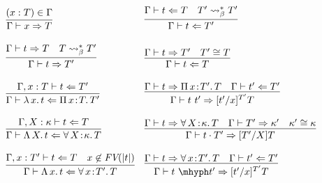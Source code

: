 \documentclass{article}
\newcommand{\abs}[4]{{#1}\, #2\! : \! #3.\, #4}
\newcommand{\absu}[3]{{#1}\, #2.\, #3}
\newcommand{\tpcheck}[0]{\Leftarrow}
\newcommand{\tpsynth}[0]{\Rightarrow}
\begin{document}
\begin{figure}
  \[
    \begin{array}{c}
  \begin{array}{ll}
    \infer{\Gamma\vdash x\tpsynth T}{(x : T)\in\Gamma} &
    \infer{\Gamma\vdash t\tpcheck T'}{\Gamma\vdash t \tpcheck T & T' \leadsto^*_\beta T'} \\ \\
    \infer{\Gamma\vdash t\tpsynth T'}{\Gamma\vdash t \tpsynth T & T \leadsto^*_\beta T'} &
    \infer{\Gamma\vdash t\tpcheck T}{\Gamma\vdash t\tpsynth T' & T' \cong T} \\ \\
    \infer{\Gamma\vdash \absu{\lambda}{x}{t} \tpcheck \abs{\Pi}{x}{T}{T'}}{\Gamma,x:T\vdash t\tpcheck T'} &
    \infer{\Gamma\vdash t\ t' \tpsynth [t'/x]^{T'}T}{\Gamma\vdash t \tpsynth \abs{\Pi}{x}{T'}{T} & \Gamma\vdash t' \tpcheck T'} \\ \\

    \infer{\Gamma\vdash \absu{\Lambda}{X}{t} \tpcheck \abs{\forall}{X}{\kappa}{T}}{\Gamma,X:\kappa\vdash t \tpcheck T} &
    \infer{\Gamma\vdash t \cdot T' \tpsynth [T'/X]T}
          {\Gamma\vdash t \tpsynth \abs{\forall}{X}{\kappa}{T} & \Gamma\vdash T' \tpsynth \kappa' & \kappa'\cong\kappa} \\ \\

    \infer{\Gamma\vdash \absu{\Lambda}{x}{t} \tpcheck \abs{\forall}{x}{T'}{T}}{\Gamma,x:T'\vdash t \tpcheck T & x\not\in\textit{FV}(|t|)} &
    \infer{\Gamma\vdash t\ \mhyph t' \tpsynth [t'/x]^{T'}T}{\Gamma\vdash t \tpsynth \abs{\forall}{x}{T'}{T} & \Gamma\vdash t' \tpcheck T'} \\ \\


\end{array}
\end{array}\]
\end{figure}
\end{document}
